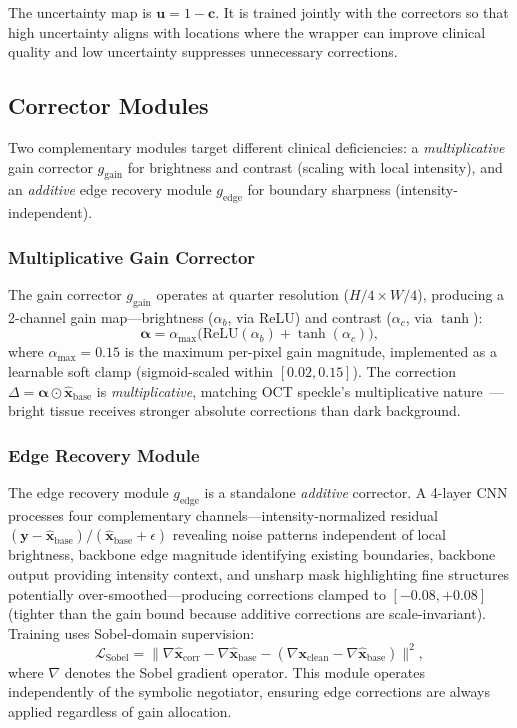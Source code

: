 \documentclass{ieeetj}
\begin{document}
The uncertainty map is $\mathbf{u}=1-\mathbf{c}$. It is trained jointly with the correctors so that high uncertainty aligns with locations where the wrapper can improve clinical quality and low uncertainty suppresses unnecessary corrections.

\subsection{Corrector Modules}
\label{sec:corrector_modules}
Two complementary modules target different clinical deficiencies: a \emph{multiplicative} gain corrector $g_{\mathrm{gain}}$ for brightness and contrast (scaling with local intensity), and an \emph{additive} edge recovery module $g_\text{edge}$ for boundary sharpness (intensity-independent).

\subsubsection{Multiplicative Gain Corrector}
The gain corrector $g_{\mathrm{gain}}$ operates at quarter resolution ($H/4 \times W/4$), producing a 2-channel gain map---brightness ($\alpha_b$, via ReLU) and contrast ($\alpha_c$, via $\tanh$):
\begin{equation}
\boldsymbol{\alpha} = \alpha_{\max}\!\big(\text{ReLU}(\alpha_b) + \tanh(\alpha_c)\big),
\label{eq:gain_map}
\end{equation}
where $\alpha_{\max} = 0.15$ is the maximum per-pixel gain magnitude, implemented as a learnable soft clamp (sigmoid-scaled within $[0.02, 0.15]$). The correction $\Delta = \boldsymbol{\alpha} \odot \hat{\mathbf{x}}_\text{base}$ is \emph{multiplicative}, matching OCT speckle's multiplicative nature~\cite{goodman2007speckle}---bright tissue receives stronger absolute corrections than dark background.

\subsubsection{Edge Recovery Module}
The edge recovery module $g_\text{edge}$ is a standalone \emph{additive} corrector. A 4-layer CNN processes four complementary channels---intensity-normalized residual $(\mathbf{y} - \hat{\mathbf{x}}_\text{base})/(\hat{\mathbf{x}}_\text{base} + \epsilon)$ revealing noise patterns independent of local brightness, backbone edge magnitude identifying existing boundaries, backbone output providing intensity context, and unsharp mask highlighting fine structures potentially over-smoothed---producing corrections clamped to $[-0.08, +0.08]$ (tighter than the gain bound because additive corrections are scale-invariant). Training uses Sobel-domain supervision:
\begin{equation}
\mathcal{L}_\text{Sobel} = \big\|\nabla\hat{\mathbf{x}}_\text{corr} - \nabla\hat{\mathbf{x}}_\text{base} - (\nabla\mathbf{x}_\text{clean} - \nabla\hat{\mathbf{x}}_\text{base})\big\|^2,
\label{eq:sobel_loss}
\end{equation}
where $\nabla$ denotes the Sobel gradient operator. This module operates independently of the symbolic negotiator, ensuring edge corrections are always applied regardless of gain allocation.
\end{document}

